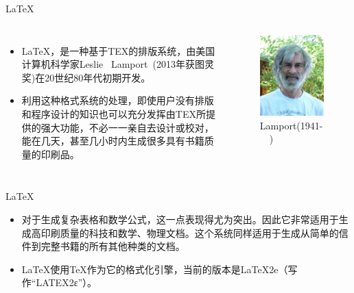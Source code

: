 \documentclass[13pt,fontset=mac]{ctexbeamer}
\begin{document}
\begin{frame}{LaTeX}
	\begin{columns}[c]  %
		
		\column{6cm}
		
\begin{itemize}
	\item LaTeX，是一种基于TEX的排版系统，由美国计算机科学家Leslie~ Lamport~(2013年获图灵奖)在20世纪80年代初期开发。
	\item 利用这种格式系统的处理，即使用户没有排版和程序设计的知识也可以充分发挥由TEX所提供的强大功能，不必一一亲自去设计或校对，能在几天，甚至几小时内生成很多具有书籍质量的印刷品。
\end{itemize}
		
	
		\column{5cm} 
		\begin{figure}[p]
			\includegraphics[scale=0.4]{Lamport.jpg}
			\caption{Lamport(1941-~~)}
		\end{figure}
		
	\end{columns}


\end{frame}

\begin{frame}{LaTeX}
\begin{itemize}
	\item 对于生成复杂表格和数学公式，这一点表现得尤为突出。因此它非常适用于生成高印刷质量的科技和数学、物理文档。这个系统同样适用于生成从简单的信件到完整书籍的所有其他种类的文档。
	\item LaTeX使用TeX作为它的格式化引擎，当前的版本是LaTeX2e（写作“LATEX2ε”）。
\end{itemize}
\end{frame}
\end{document}
